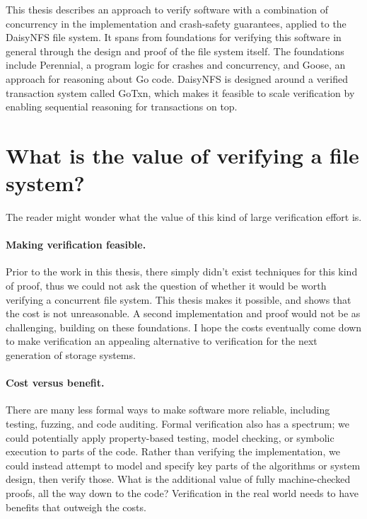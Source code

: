 This thesis describes an approach to verify software with a combination of
concurrency in the implementation and crash-safety guarantees, applied to the
DaisyNFS file system. It spans from foundations for verifying this software in
general through the design and proof of the file system itself. The foundations
include Perennial, a program logic for crashes and concurrency, and Goose, an
approach for reasoning about Go code. DaisyNFS is designed around a verified
transaction system called GoTxn, which makes it feasible to scale verification
by enabling sequential reasoning for transactions on top.

\section{What is the value of verifying a file system?}

The reader might wonder what the value of this kind of large verification effort
is.

\paragraph{Making verification feasible.}
Prior to the work in this thesis, there simply didn't exist techniques for this
kind of proof, thus we could not ask the question of whether it would be worth
verifying a concurrent file system. This thesis makes it possible, and shows
that the cost is not unreasonable. A second implementation and proof would not
be as challenging, building on these foundations. I hope the costs eventually
come down to make verification an appealing alternative to verification for the
next generation of storage systems.

\paragraph{Cost versus benefit.} There are many less formal ways to make
software more reliable, including testing, fuzzing, and code auditing. Formal
verification also has a spectrum; we could potentially apply property-based
testing, model checking, or symbolic execution to parts of the code. Rather than
verifying the implementation, we could instead attempt to model and specify key
parts of the algorithms or system design, then verify those. What is the
additional value of fully machine-checked proofs, all the way down to the code?
Verification in the real world needs to have benefits that outweigh the costs.

